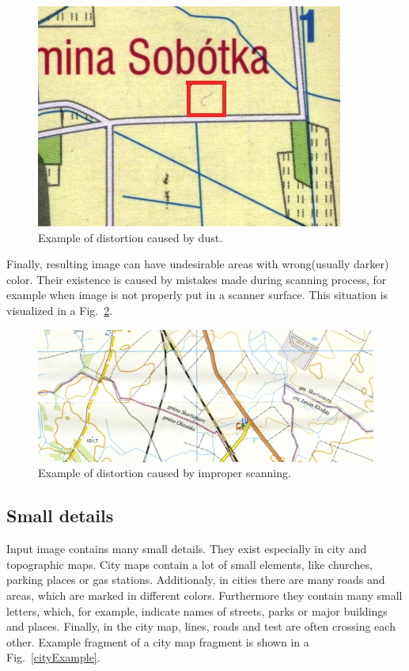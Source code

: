 \documentclass[a4paper,onecolumn,oneside,12pt]{memoir}
\begin{document}
\begin{figure}[!ht]
\begin{center}
\includegraphics[scale=3.0]{images/dustExample.jpg}
\caption{Example of distortion caused by dust.}
\label{dustExample}
\end{center}
\end{figure}

Finally, resulting image can have undesirable areas with wrong(usually darker) color. Their
existence is caused by mistakes made during scanning process, for example when image is not properly
put in a scanner surface. This situation is visualized in a Fig.~\ref{badScanExample}.

\begin{figure}[!ht]
\begin{center}
\includegraphics[scale=1.3]{images/badScanExample.jpg}
\caption{Example of distortion caused by improper scanning.}
\label{badScanExample}
\end{center}
\end{figure}

\subsection{Small details}

Input image contains many small details. They exist especially in city and topographic maps.
City maps contain a lot of small elements, like churches, parking places or gas stations.
Additionaly, in cities there are many roads and areas, which are marked in different colors. 
Furthermore they contain many small letters, which, for example, indicate names of streets, parks
or major buildings and places. Finally, in the city map, lines, roads and test are 
often crossing each other. Example fragment of a city map fragment is shown in a 
Fig.~\ref{cityExample}.
\end{document}
